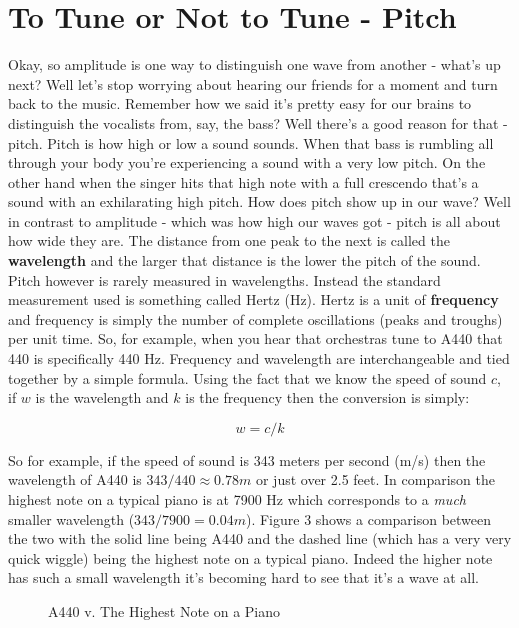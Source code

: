 \documentclass[10pt,a5paper]{book}
\begin{document}
\section{To Tune or Not to Tune - Pitch}
Okay, so amplitude is one way to distinguish one wave from another - what's up next? Well let's stop worrying about hearing our friends for a moment and turn back to the music. Remember how we said it's pretty easy for our brains to distinguish the vocalists from, say, the bass? Well there's a good reason for that - pitch. Pitch is how high or low a sound sounds. When that bass is rumbling all through your body you're experiencing a sound with a very low pitch. On the other hand when the singer hits that high note with a full crescendo that's a sound with an exhilarating high pitch. How does pitch show up in our wave? Well in contrast to amplitude - which was how high our waves got - pitch is all about how wide they are. The distance from one peak to the next is called the \textbf{wavelength} and the larger that distance is the lower the pitch of the sound. Pitch however is rarely measured in wavelengths. Instead the standard measurement used is something called Hertz (Hz). Hertz is a unit of \textbf{frequency} and frequency is simply the number of complete oscillations (peaks and troughs) per unit time. So, for example, when you hear that orchestras tune to A440 that 440 is specifically 440 Hz. Frequency and wavelength are interchangeable and tied together by a simple formula. Using the fact that we know the speed of sound $c$, if $w$ is the wavelength and $k$ is the frequency then the conversion is simply:

\begin{equation}
w = c/k
\end{equation}

So for example, if the speed of sound is 343 meters per second (m/s) then the wavelength of A440 is $343/440\approx0.78m$ or just over 2.5 feet. In comparison the highest note on a typical piano is at 7900 Hz \cite{wikipiano} which corresponds to a \textit{much} smaller wavelength ($343/7900=0.04m$). Figure 3 shows a comparison between the two with the solid line being A440 and the dashed line (which has a very very quick wiggle) being the highest note on a typical piano. Indeed the higher note has such a small wavelength it's becoming hard to see that it's a wave at all.

\begin{figure}[!htb]
\caption{\label{fig:my-label} A440 v. The Highest Note on a Piano}
\end{figure}
\end{document}
